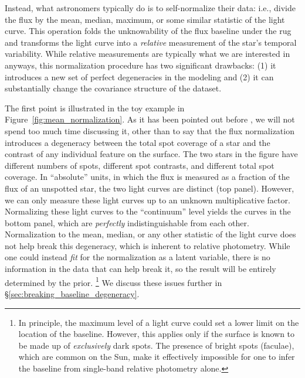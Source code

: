 \documentclass[modern]{aastex62}
\begin{document}
Instead, what astronomers typically do is to self-normalize their data:
i.e., divide the flux by the mean, median, maximum, or some similar
statistic of the light curve. This operation folds the unknowability of
the flux baseline under the rug and transforms the light curve into a \emph{relative}
measurement of the star's temporal variability. While relative measurements
are typically what we are interested in anyways, this normalization procedure
has two significant drawbacks: (1) it introduces a new set of perfect degeneracies
in the modeling and (2) it can substantially change the covariance structure
of the dataset.

The first point is illustrated in the toy example in
Figure~\ref{fig:mean_normalization}. As it has been pointed out before
\citep[e.g.,][]{Basri2018},
we will not spend too much time discussing it, other than to say that the
flux normalization introduces a degeneracy between the total spot coverage
of a star and the contrast of any individual feature on the surface.
The two stars in the figure have different numbers of spots, different
spot contrasts, and different total spot coverage. In ``absolute'' units, in which
the flux is measured as a fraction of the flux of an unspotted star, the two
light curves are distinct (top panel). However, we can only measure these light
curves up to an unknown multiplicative factor. Normalizing these light curves
to the ``continuum'' level yields the curves in the bottom panel, which are
\emph{perfectly} indistinguishable from each other. Normalization to the mean,
median, or any other statistic of the light curve does not help break this
degeneracy, which is inherent to relative photometry. While one could instead \emph{fit}
for the normalization as a latent variable, there is no information in the data
that can help break it, so the result will be entirely determined by the prior.%
\footnote{%
    In principle, the maximum level of a light curve could set a lower limit on
    the location of the baseline. However, this applies only if the surface is
    known to be made up of \emph{exclusively} dark spots. The presence of bright
    spots (faculae), which are common on the Sun, make it effectively impossible
    for one to infer the baseline from single-band relative photometry alone.
}
We discuss these issues further in \S\ref{sec:breaking_baseline_degeneracy}.
\end{document}

